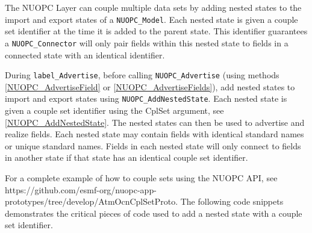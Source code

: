 %

\label{CplSets}

The NUOPC Layer can couple multiple data sets by adding nested states to the import and export states of a {\tt NUOPC\_Model}. Each nested state is given a couple set identifier at the time it is added to the parent state. This identifier guarantees a {\tt NUOPC\_Connector} will only pair fields within this nested state to fields in a connected state with an identical identifier.

During {\tt label\_Advertise}, before calling {\tt NUOPC\_Advertise} (using methods \ref{NUOPC_AdvertiseField} or \ref{NUOPC_AdvertiseFields}), add nested states to import and export states using {\tt NUOPC\_AddNestedState}. Each nested state is given a couple set identifier using the CplSet argument, see \ref{NUOPC_AddNestedState}. The nested states can then be used to advertise and realize fields. Each nested state may contain fields with identical standard names or unique standard names. Fields in each nested state will only connect to fields in another state if that state has an identical couple set identifier.

For a complete example of how to couple sets using the NUOPC API, see https://github.com/esmf-org/nuopc-app-prototypes/tree/develop/AtmOcnCplSetProto. The following code snippets demonstrates the critical pieces of code used to add a nested state with a couple set identifier.

